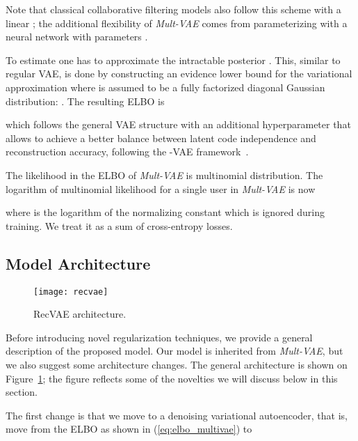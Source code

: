 \documentclass[sigconf,authorversion]{acmart}
\begin{document}
Note that classical collaborative filtering models also follow this scheme with a linear ; the additional flexibility of \emph{Mult-VAE} comes from parameterizing  with a neural network with parameters .

To estimate  one has to approximate the intractable posterior . This, similar to regular VAE, is done by constructing an evidence lower bound for the variational approximation where  is assumed to be a fully factorized diagonal Gaussian distribution: . The resulting ELBO is


which follows the general VAE structure with an additional hyperparameter  that allows to achieve a better balance between latent code independence and reconstruction accuracy, following the -VAE framework~\cite{Higgins2017betaVAELB}.


The likelihood  in the ELBO of \emph{Mult-VAE} is multinomial distribution. The logarithm of multinomial likelihood for a single user  in \emph{Mult-VAE} is now

where  is the logarithm of the normalizing constant which is ignored during training. We treat it as a sum of cross-entropy losses.

\subsection{Model Architecture}\label{sec:arch}

\begin{figure}[!t]
  \centering
  \texttt{[image: recvae]}
  \caption{RecVAE architecture.}
  \label{fig:recvae}\vspace{-.45cm}
\end{figure}

Before introducing novel regularization techniques, we provide a general description of the proposed model. Our model is inherited from \emph{Mult-VAE}, but we also suggest some architecture changes. The general architecture is shown on Figure~\ref{fig:recvae}; the figure reflects some of the novelties we will discuss below in this section.

The first change is that we move to a denoising variational autoencoder, that is, move from the ELBO as shown in (\ref{eq:elbo_multivae}) to
\end{document}
